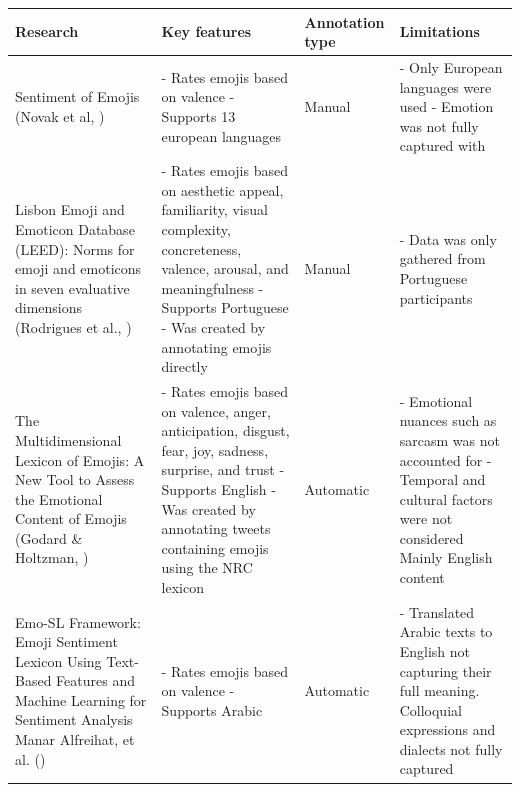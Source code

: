 \begin{center}
	\begin{tabular}{|m{10em} | m{7em} | m{5em} | m{7em} |}
		\hline
		Research & Key features & Annotation type & Limitations \\
		\hline
		Sentiment of Emojis (Novak et al, \citeyear{KraljNovak2015}) &
		- Rates emojis based on valence
		\newline - Supports 13 european languages &
		Manual &
		- Only European languages were used
		\newline - Emotion was not fully captured with \\
		\hline
		Lisbon Emoji and Emoticon Database (LEED): Norms for emoji and emoticons in seven evaluative dimensions (Rodrigues et al., \citeyear{Rodrigues2017}) &
		- Rates emojis based on aesthetic appeal, familiarity, visual complexity, concreteness, valence, arousal, and meaningfulness
		\newline - Supports Portuguese 
		\newline - Was created by annotating emojis directly &
		Manual &
		- Data was only gathered from Portuguese participants \\
		\hline
		The Multidimensional Lexicon of Emojis: A New Tool to Assess the Emotional Content of Emojis (Godard \& Holtzman, \citeyear{Godard2022}) &
		- Rates emojis based on valence, anger, anticipation, disgust, fear, joy, sadness, surprise, and trust
		\newline - Supports English 
		\newline - Was created by annotating tweets containing emojis using the NRC lexicon &
		Automatic & 
		- Emotional nuances such as sarcasm was not accounted for
		\newline - Temporal and cultural factors were not considered
		Mainly English content \\
		\hline
		Emo-SL Framework: Emoji Sentiment Lexicon Using Text-Based Features and Machine Learning for Sentiment Analysis Manar Alfreihat, et al. (\citeyear{Alfreihat2024}) &
		- Rates emojis based on valence
		\newline - Supports Arabic &
		Automatic &
		- Translated Arabic texts to English not capturing their full meaning. Colloquial expressions and dialects not fully captured \\
		\hline
	\end{tabular}
\end{center}
	\newpage

